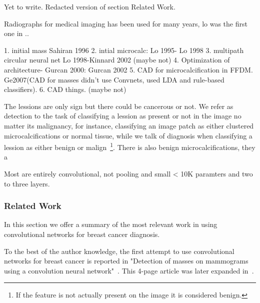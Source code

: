 Yet to write. Redacted version of section Related Work.

Radiographs for medical imaging has been used for many years, lo was the first one in ..

1. initial mass Sahiran 1996
2. intial microcalc: Lo 1995- Lo 1998
3. multipath circular neural net Lo 1998-Kinnard 2002 (maybe not)
4. Optimization of architecture- Gurcan 2000: Gurcan 2002
5. CAD for microcalcification in FFDM. Ge2007(CAD for masses didn't use Convnets, used LDA and rule-based classifiers).
6. CAD things. (maybe not)


The lessions are only sign but there could be cancerous or not. 
We refer as detection to the task of classifying a lession as present or not in the image no matter its malignancy, for instance, classifying an image patch as either clustered microcalcifications or normal tissue, while we talk of diagnosis when classifying a lession as either benign or malign~\footnote{If the feature is not actually present on the image it is considered benign.}.
There is also benign microcalcifications, they a

Most are entirely convolutional, not pooling and small < 10K paramters and two to three layers.
\subsubsection{Related Work}
In this section we offer a summary of the most relevant work in using convolutional networks for breast cancer diagnosis. %


To the best of the author knowledge, the first attempt to use convolutional networks for breast cancer is reported in "Detection of masses on mammograms using a convolution neural network"~\cite{Wei1995}. This 4-page article was later expanded in~\cite{Sahiner1996}.

